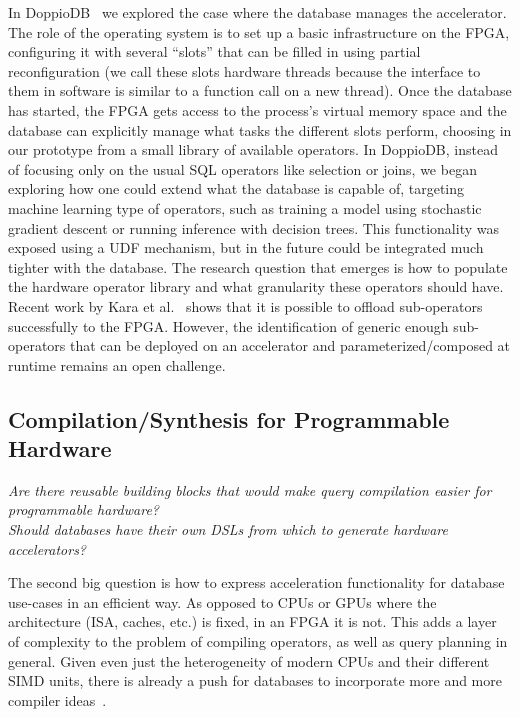 \documentclass[11pt]{article}
\begin{document}
In DoppioDB~\cite{owaida-centaur-fccm17}\cite{sidler-doppiodb-sigmod17} we explored the case where the database manages the accelerator. The role of the operating system is to set up a basic infrastructure on the FPGA, configuring it with several ``slots'' that can be filled in using partial reconfiguration (we call these slots hardware threads because the interface to them in software is similar to a function call on a new thread). Once the database has started, the FPGA gets access to the process's virtual memory space and the database can explicitly manage what tasks the different slots perform, choosing in our prototype from a small library of available operators. In DoppioDB, instead of focusing only on the usual SQL operators like selection or joins, we began exploring how one could extend what the database is capable of, targeting machine learning type of operators, such as training a model using stochastic gradient descent or running inference with decision trees. This functionality was exposed using a UDF mechanism, but in the future could be integrated much tighter with the database. The research question that emerges is how to populate the hardware operator library and what granularity these operators should have. Recent work by Kara et al.~\cite{kara-join-sigmod17} shows that it is possible to offload sub-operators successfully to the FPGA. However, the identification of generic enough sub-operators that can be deployed on an accelerator and parameterized/composed at runtime remains an open challenge.

\subsection{Compilation/Synthesis for Programmable Hardware}


\emph{Are there reusable building blocks that would make query compilation easier for programmable hardware?}\\
\emph{Should databases have their own DSLs from which to generate hardware accelerators?}
\smallskip

The second big question is how to express acceleration functionality for database use-cases in an efficient way. As opposed to CPUs or GPUs where the architecture (ISA, caches, etc.) is fixed, in an FPGA it is not. This adds a layer of complexity to the problem of compiling operators, as well as query planning in general. 
Given even just the heterogeneity of modern CPUs and their different SIMD units, there is already a push for databases to incorporate more and more compiler ideas~\cite{pirk-compiler-cidr19}\cite{pirk-voodoo-vldb16}. 
\end{document}
